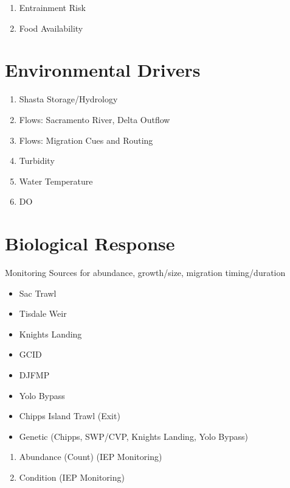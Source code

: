 \documentclass[
]{book}
\providecommand{\tightlist}{%
  \setlength{\itemsep}{0pt}\setlength{\parskip}{0pt}}
\theoremstyle{definition}
\theoremstyle{definition}
\theoremstyle{definition}
\theoremstyle{definition}
\theoremstyle{remark}
\begin{document}
\begin{enumerate}
\def\labelenumi{\arabic{enumi}.}
\setcounter{enumi}{1}
\item
  Entrainment Risk
\item
  Food Availability
\end{enumerate}

\hypertarget{environmental-drivers-3}{%
\section{Environmental Drivers}\label{environmental-drivers-3}}

\begin{enumerate}
\def\labelenumi{\arabic{enumi}.}
\item
  Shasta Storage/Hydrology
\item
  Flows: Sacramento River, Delta Outflow
\item
  Flows: Migration Cues and Routing
\item
  Turbidity
\item
  Water Temperature
\item
  DO
\end{enumerate}

\hypertarget{biological-response-4}{%
\section{Biological Response}\label{biological-response-4}}

Monitoring Sources for abundance, growth/size, migration timing/duration

\begin{itemize}
\tightlist
\item
  Sac Trawl
\item
  Tisdale Weir
\item
  Knights Landing
\item
  GCID
\item
  DJFMP
\item
  Yolo Bypass
\item
  Chipps Island Trawl (Exit)
\item
  Genetic (Chipps, SWP/CVP, Knights Landing, Yolo Bypass)
\end{itemize}

\begin{enumerate}
\def\labelenumi{\arabic{enumi}.}
\item
  Abundance (Count) (IEP Monitoring)
\item
  Condition (IEP Monitoring)
\end{enumerate}
\end{document}
